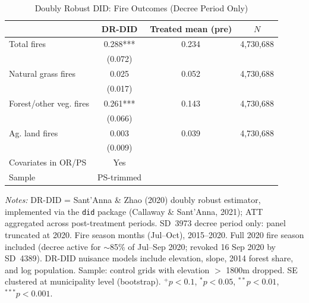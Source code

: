 \begin{table}[htbp]
\centering
\small
\caption{Doubly Robust DID: Fire Outcomes (Decree Period Only)}
\label{tab:did_drdid_fire_decree}
\begin{tabular}{lccc}
\toprule
 & DR-DID & Treated mean (pre) & $N$ \\
\midrule
Total fires & 0.288*** & 0.234 & 4,730,688 \\
 & (0.072) & & \\
[0.5em]
Natural grass fires & 0.025 & 0.052 & 4,730,688 \\
 & (0.017) & & \\
[0.5em]
Forest/other veg. fires & 0.261*** & 0.143 & 4,730,688 \\
 & (0.066) & & \\
[0.5em]
Ag. land fires & 0.003 & 0.039 & 4,730,688 \\
 & (0.009) & & \\
\midrule
Covariates in OR/PS & Yes & & \\
Sample & PS-trimmed & & \\
\bottomrule
\end{tabular}
\begin{tablenotes}[flushleft]
\small
\item \textit{Notes:} DR-DID = Sant'Anna \& Zhao (2020) doubly robust estimator, implemented via the \texttt{did} package (Callaway \& Sant'Anna, 2021); ATT aggregated across post-treatment periods. SD~3973 decree period only: panel truncated at 2020. Fire season months (Jul--Oct), 2015--2020. Full 2020 fire season included (decree active for $\sim$85\% of Jul--Sep 2020; revoked 16 Sep 2020 by SD~4389). DR-DID nuisance models include elevation, slope, 2014 forest share, and log population. Sample: control grids with elevation $>$ 1800m dropped. SE clustered at municipality level (bootstrap). $^{+}p<0.1$, $^{*}p<0.05$, $^{**}p<0.01$, $^{***}p<0.001$.
\end{tablenotes}
\end{table}
